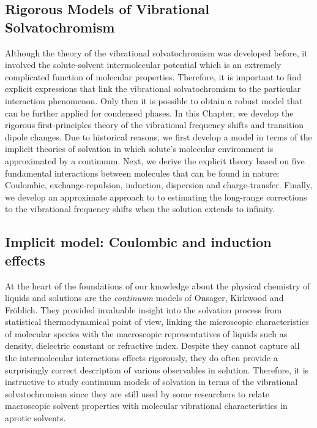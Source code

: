 \documentclass[a4paper,titlepage,twoside,fleqn,12pt]{book}
\begin{document}
\begin{refsection}
\chapter{Rigorous Models of Vibrational Solvatochromism \label{c:my-model}}

Although the theory of the vibrational solvatochromism
was developed before, it involved the solute\hyp{}solvent
intermolecular potential which is an extremely complicated function
of molecular properties.
Therefore, it is important to find explicit 
expressions that link the vibrational solvatochromism
to the particular interaction phenomenon.
Only then it is possible to obtain a robust model
that can be further applied for condensed phases. 
In this Chapter, we develop the rigorous first\hyp{}principles
theory of the vibrational frequency shifts and transition
dipole changes.
Due to historical reasons, we first develop a model in terms
of the implicit theories of solvation in which solute's molecular
environment is approximated by a continuum. 
Next, we derive the explicit theory based on five fundamental interactions
between molecules that can be found in nature: Coulombic, 
exchange\hyp{}repulsion, induction, dispersion and charge\hyp{}transfer.
Finally, we develop an approximate approach to
to estimating the long\hyp{}range corrections to the vibrational
frequency shifts when the solution extends to infinity.

\section{Implicit model: Coulombic and induction effects}

At the heart of the foundations of our knowledge about the 
physical chemistry of liquids and solutions are the \emph{continuum}
models of Onsager, Kirkwood and Fr{\"o}hlich. They
provided invaluable insight into the solvation
process from statistical thermodynamical point of view, linking
the microscopic characteristics of molecular species
with the macroscopic representatives of liquids
such as density, dielectric constant or refractive index.
Despite they cannot capture all the intermolecular
interactions effects rigorously, they do often provide a surprisingly 
correct
description of various observables in solution.
Therefore, it is instructive to study continuum models of solvation
in terms of the vibrational solvatochromism since they 
are still used by some researchers to relate macroscopic
solvent properties with molecular vibrational characteristics
in aprotic solvents.


\end{refsection}
\end{document}
